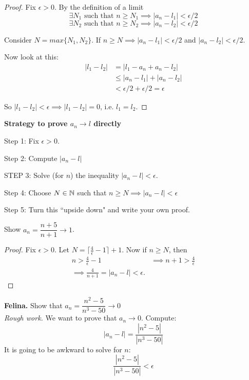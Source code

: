 \documentclass[twoside]{scrartcl}
\begin{document}
\begin{proof}
Fix $\epsilon >0$. By the definition of a limit 
\[\exists N_1 \text{ such that } n \geq N_1 \implies |a_n - l_1| <\epsilon/2\]	
\[\exists N_2 \text{ such that } n \geq N_2 \implies |a_n - l_2| <\epsilon/2\]	

Consider $N = max\{N_1,N_2\}$. If $n \geq N \implies |a_n - l_1| < \epsilon/2$ and $|a_n - l_2| <\epsilon/2$. 

Now look at this: 
\[
\begin{aligned}
  |l_1 - l_2| &= |l_1 - a_n + a_n - l_2|\\
  &\leq |a_n - l_1| + |a_n - l_2|\\
  &< \epsilon /2 + \epsilon/2 =\epsilon 
\end{aligned}
\]

So $|l_1 - l_2| < \epsilon \implies |l_1 - l_2| = 0$, i.e. $l_1 = l_2$. 
\end{proof}


\textbf{Strategy to prove $a_n \to l$ directly}

Step 1: Fix $\epsilon >0$. 

Step 2: Compute $|a_n - l|$

STEP 3: Solve (for $n$) the inequality $|a_n - l| < \epsilon$. 

Step 4: Choose $N \in\mathbb{N}$ such that $n \geq N \implies |a_n - l| < \epsilon$	

Step 5: Turn this ``upside down" and write your own proof.\\

\begin{example}
Show $a_n= \dfrac{n+5}{n+1} \to 1$.

\begin{proof}
Fix $\epsilon >0.$ Let $N = \lceil \frac{4}{\epsilon} -1\rceil +1$. Now if $n \geq N$, then 
\[
\begin{aligned}
  n > \frac{4}{\epsilon} - 1 &\implies n + 1> \frac{4}{\epsilon}\\
  \implies \frac{4}{n+1} = |a_n - l| < \epsilon.
\end{aligned}
\]
\end{proof}
\end{example}

	
	
	\textbf{Felina.} Show that $a_n = \dfrac{n^2 - 5}{n^3-50} \to 0$\\
	
	\emph{Rough work.} We want to prove that $a_n \to 0$. Compute: 
	\[|a_n - l| = \frac{|n^2- 5|}{|n^3 - 50|}\]
	It is going to be awkward to solve for $n$: 
	\[\frac{|n^2- 5|}{|n^3 - 50|} < \epsilon\]
	
\end{document}
